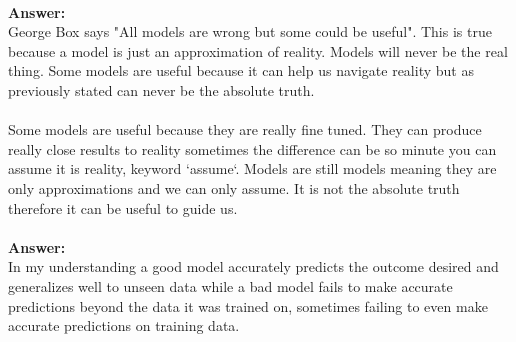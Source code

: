 \documentclass[12pt]{article}
\begin{document}
\begin{enumerate}
\\

\textbf{Answer: } \\ 
George Box says "All models are wrong but some could be useful". This is true because a model is just an approximation of reality. Models will never be the real thing. Some models are useful because it can help us navigate reality but as previously stated can never be the absolute truth. \\ 

\\
Some models are useful because they are really fine tuned. They can produce really close results to reality sometimes the difference can be so minute you can assume it is reality, keyword `assume`. Models are still models meaning they are only approximations and we can only assume. It is not the absolute truth therefore it can be useful to guide us. 
\\

\\ 
\textbf{Answer: } \\ 
In my understanding a good model accurately predicts the outcome desired and generalizes well to unseen data while a bad model fails to make accurate predictions beyond the data it was trained on, sometimes failing to even make accurate predictions on training data. \\
\end{enumerate}




\end{document}
